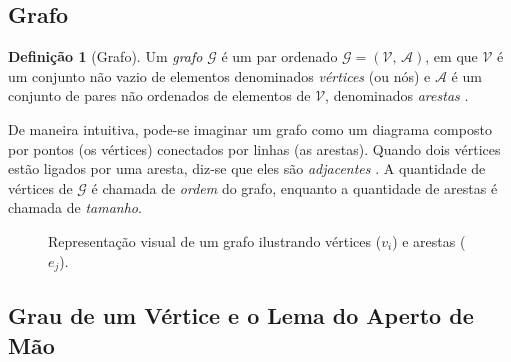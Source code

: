 \documentclass[
  12pt,
  oneside,
  a4paper,
  english,
  brazilian
  ]{abntex2}
\theoremstyle{definition}
\newtheorem{definicao}{Definição}[chapter]
\begin{document}
\subsection{Grafo}

\begin{definicao}[Grafo]
\label{def:grafo}
  Um \textit{grafo} $\mathcal{G}$ é um par ordenado
  $\mathcal{G} = (\mathcal{V},\, \mathcal{A})$, em que $\mathcal{V}$ é um
  conjunto não vazio de elementos denominados \textit{vértices} (ou nós) e
  $\mathcal{A}$ é um conjunto de pares não ordenados de elementos de
  $\mathcal{V}$, denominados \textit{arestas} \cite{boaventura2009}.
\end{definicao}

De maneira intuitiva, pode-se imaginar um grafo como um diagrama composto por
pontos (os vértices) conectados por linhas (as arestas). Quando dois vértices
estão ligados por uma aresta, diz-se que eles são \textit{adjacentes}
\cite{rosen2012}. A quantidade de vértices de $\mathcal{G}$ é chamada de
\textit{ordem} do grafo, enquanto a quantidade de arestas é chamada de
\textit{tamanho}.

\begin{figure}[H] %
    \centering
    \caption{Representação visual de um grafo ilustrando vértices ($v_i$) e arestas ($e_j$).}
    \label{fig:representacao_grafo_def}
\end{figure}

\subsection{Grau de um Vértice e o Lema do Aperto de Mão}
\end{document}
